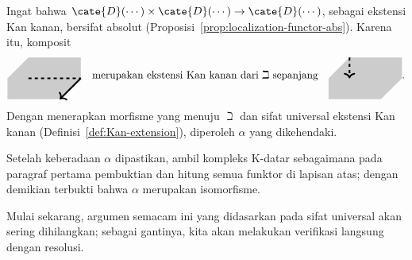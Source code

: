 \begin{bukti}
	Ingat bahwa $\cate{D}(\cdots)\times\cate{D}(\cdots)\to\cate{D}(\cdots)$,
	sebagai ekstensi Kan kanan, bersifat absolut
	(Proposisi~\ref{prop:localization-functor-abs}). Karena itu, komposit
	\begin{equation*}\begin{gathered}
		\begin{tikzpicture}[baseline=(O), scale=0.7]
			\fill[gray!40] (-1, 1) -- (1.5, 1) -- (1.5, 0) -- (0.5, -1) -- (-2, -1) -- (-2, 0) --cycle;
			\draw[ultra thick, dashed] (-1,0) -- (1.5, 0);
			\draw[ultra thick, ->] (1.5, 0)  -- (0.5, -1);
			\coordinate (O) at (0, 0);
		\end{tikzpicture}
		\quad \text{merupakan ekstensi Kan kanan dari $\beth$ sepanjang} \quad
		\begin{tikzpicture}[baseline=(O), scale=0.7]
			\fill[gray!40] (-1, 1) -- (1.5, 1) -- (1.5, 0) -- (0.5, -1) -- (-2, -1) -- (-2, 0) --cycle;
			\draw[ultra thick, dashed, ->] (-1, 1) -- (-1, 0);
			\coordinate (O) at (0, 0);
		\end{tikzpicture}.
	\end{gathered}\end{equation*}
	Dengan menerapkan morfisme yang menuju $\beth$ dan sifat universal ekstensi
	Kan kanan (Definisi~\ref{def:Kan-extension}), diperoleh $\alpha$ yang
	dikehendaki.

	Setelah keberadaan $\alpha$ dipastikan, ambil kompleks K-datar sebagaimana
	pada paragraf pertama pembuktian dan hitung semua funktor di lapisan atas;
	dengan demikian terbukti bahwa $\alpha$ merupakan isomorfisme.
\end{bukti}

Mulai sekarang, argumen semacam ini yang didasarkan pada sifat universal akan
sering dihilangkan; sebagai gantinya, kita akan melakukan verifikasi langsung
dengan resolusi.
